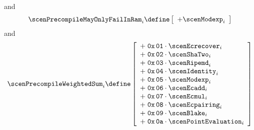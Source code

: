and
\[
	\scenPrecompileMayOnlyFailInRam _{i}
	\define
	\left[ \begin{array}{l}
		+ \scenModexp    _{i} \\
	\end{array} \right]
\]
and
\[
	\scenPrecompileWeightedSum _{i}
	\define
	\left[ \begin{array}{l}
		+ \; \mathtt{0x\,01} \cdot \scenEcrecover       _{i} \\
		+ \; \mathtt{0x\,02} \cdot \scenShaTwo          _{i} \\
		+ \; \mathtt{0x\,03} \cdot \scenRipemd          _{i} \\
		+ \; \mathtt{0x\,04} \cdot \scenIdentity        _{i} \\
		+ \; \mathtt{0x\,05} \cdot \scenModexp          _{i} \\
		+ \; \mathtt{0x\,06} \cdot \scenEcadd           _{i} \\
		+ \; \mathtt{0x\,07} \cdot \scenEcmul           _{i} \\
		+ \; \mathtt{0x\,08} \cdot \scenEcpairing       _{i} \\
		+ \; \mathtt{0x\,09} \cdot \scenBlake           _{i} \\
		+ \; \mathtt{0x\,0a} \cdot \scenPointEvaluation _{i} \\
	\end{array} \right]
\]
